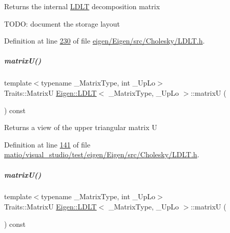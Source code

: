 \begin{DoxyReturn}{Returns}
the internal \hyperlink{group___cholesky___module_class_eigen_1_1_l_d_l_t}{L\+D\+LT} decomposition matrix
\end{DoxyReturn}
T\+O\+DO\+: document the storage layout 

Definition at line \hyperlink{eigen_2_eigen_2src_2_cholesky_2_l_d_l_t_8h_source_l00230}{230} of file \hyperlink{eigen_2_eigen_2src_2_cholesky_2_l_d_l_t_8h_source}{eigen/\+Eigen/src/\+Cholesky/\+L\+D\+L\+T.\+h}.

\mbox{\label{group___cholesky___module_a54838a2e31e53bbe4dcb78b5e80c8484}} 
\subparagraph{\texorpdfstring{matrix\+U()}{matrixU()}\hspace{0.1cm}{\footnotesize\ttfamily [1/2]}}
{\footnotesize\ttfamily template$<$typename \+\_\+\+Matrix\+Type, int \+\_\+\+Up\+Lo$>$ \\
Traits\+::\+MatrixU \hyperlink{group___cholesky___module_class_eigen_1_1_l_d_l_t}{Eigen\+::\+L\+D\+LT}$<$ \+\_\+\+Matrix\+Type, \+\_\+\+Up\+Lo $>$\+::matrixU (\begin{DoxyParamCaption}{ }\end{DoxyParamCaption}) const\hspace{0.3cm}{\ttfamily [inline]}}

\begin{DoxyReturn}{Returns}
a view of the upper triangular matrix U 
\end{DoxyReturn}


Definition at line \hyperlink{matio_2visual__studio_2test_2eigen_2_eigen_2src_2_cholesky_2_l_d_l_t_8h_source_l00141}{141} of file \hyperlink{matio_2visual__studio_2test_2eigen_2_eigen_2src_2_cholesky_2_l_d_l_t_8h_source}{matio/visual\+\_\+studio/test/eigen/\+Eigen/src/\+Cholesky/\+L\+D\+L\+T.\+h}.

\mbox{\label{group___cholesky___module_a54838a2e31e53bbe4dcb78b5e80c8484}} 
\subparagraph{\texorpdfstring{matrix\+U()}{matrixU()}\hspace{0.1cm}{\footnotesize\ttfamily [2/2]}}
{\footnotesize\ttfamily template$<$typename \+\_\+\+Matrix\+Type, int \+\_\+\+Up\+Lo$>$ \\
Traits\+::\+MatrixU \hyperlink{group___cholesky___module_class_eigen_1_1_l_d_l_t}{Eigen\+::\+L\+D\+LT}$<$ \+\_\+\+Matrix\+Type, \+\_\+\+Up\+Lo $>$\+::matrixU (\begin{DoxyParamCaption}{ }\end{DoxyParamCaption}) const\hspace{0.3cm}{\ttfamily [inline]}}

